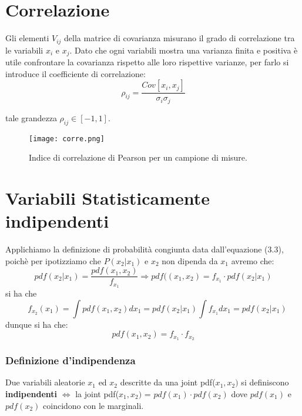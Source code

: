 \documentclass[11pt,a4paper]{book}
\begin{document}
\section{Correlazione}
Gli elementi $V_{ij}$ della matrice di covarianza misurano il grado di correlazione tra le variabili $x_i$ e $x_j$. Dato che ogni variabili mostra una varianza finita e positiva \`{e} utile confrontare la covarianza  rispetto alle loro rispettive varianze, per farlo si introduce il coefficiente di correlazione:
\begin{equation}
	\rho_{ij} = \dfrac{Cov[x_i,x_j]}{\sigma_i \sigma_j}
\end{equation}

tale grandezza $\rho_{ij} \in [-1,1]$.

\begin{figure}[ht]
\vspace{0.2in}
\texttt{[image: corre.png]}	
\centering
\vspace{0.2in}
\caption{Indice di correlazione di Pearson per un campione di misure.}
\end{figure} 

\section{Variabili Statisticamente indipendenti}
Applichiamo la definizione di probabilit\`{a} congiunta data dall'equazione (3.3), poich\`{e} per ipotizziamo che  $P(x_2 \vert x_1)$ e $x_2$ non dipenda da $x_1$ avremo che:
\begin{equation*}
pdf(x_2 \vert x_1) = \dfrac{pdf(x_1,x_2)}{f_{x_1}} \Rightarrow pdf((x_1,x_2) = f_{x_1} \cdot pdf(x_2 \vert x_1)
\end{equation*}
si ha che  
\begin{equation*}
\quad f_{x_2}(x_1) = \int pdf(x_1,x_2)dx_1 = pdf(x_2\vert x_1) \int f_{x_1}dx_{1} = pdf (x_2 \vert x_1)
\end{equation*}
dunque si ha che:
\begin{equation*}
	pdf(x_1,x_2) = f_{x_1} \cdot f_{x_2}
\end{equation*}

\subsubsection{Definizione d'indipendenza}
Due variabili aleatorie $x_1$ ed $x_2$ descritte da una joint pdf($x_1,x_2)$ si definiscono \textbf{indipendenti} $\iff$ la joint pdf($x_1,x_2)$ = $pdf(x_1) \cdot pdf(x_2)$ dove $ pdf(x_1)$ e $pdf(x_2)$ coincidono con le marginali.
\end{document}

